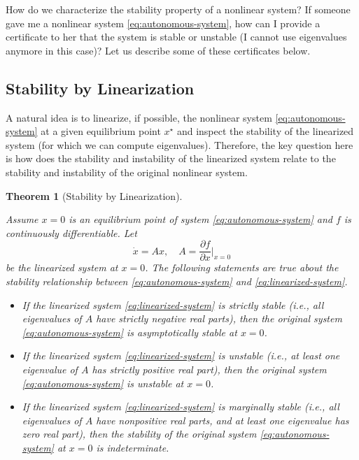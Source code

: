 \documentclass[
]{book}
\newtheorem{theorem}{Theorem}[chapter]
\theoremstyle{definition}
\theoremstyle{definition}
\theoremstyle{definition}
\theoremstyle{definition}
\theoremstyle{remark}
\begin{document}
How do we characterize the stability property of a nonlinear system? If someone gave me a nonlinear system \eqref{eq:autonomous-system}, how can I provide a certificate to her that the system is stable or unstable (I cannot use eigenvalues anymore in this case)? Let us describe some of these certificates below.

\hypertarget{stability-by-linearization}{%
\subsection{Stability by Linearization}\label{stability-by-linearization}}

A natural idea is to linearize, if possible, the nonlinear system \eqref{eq:autonomous-system} at a given equilibrium point \(x^\star\) and inspect the stability of the linearized system (for which we can compute eigenvalues). Therefore, the key question here is how does the stability and instability of the linearized system relate to the stability and instability of the original nonlinear system.

\begin{theorem}[Stability by Linearization]
\protect\hypertarget{thm:stabilitybylinearization}{}\label{thm:stabilitybylinearization}

Assume \(x=0\) is an equilibrium point of system \eqref{eq:autonomous-system} and \(f\) is continuously differentiable. Let
\begin{equation}
\dot{x} = Ax, \quad A = \frac{\partial f}{\partial x} \Big\vert_{x=0}
\label{eq:linearized-system}
\end{equation}
be the linearized system at \(x=0\). The following statements are true about the stability relationship between \eqref{eq:autonomous-system} and \eqref{eq:linearized-system}.

\begin{itemize}
\item
  If the linearized system \eqref{eq:linearized-system} is strictly stable (i.e., all eigenvalues of \(A\) have strictly negative real parts), then the original system \eqref{eq:autonomous-system} is asymptotically stable at \(x=0\).
\item
  If the linearized system \eqref{eq:linearized-system} is unstable (i.e., at least one eigenvalue of \(A\) has strictly positive real part), then the original system \eqref{eq:autonomous-system} is unstable at \(x=0\).
\item
  If the linearized system \eqref{eq:linearized-system} is marginally stable (i.e., all eigenvalues of \(A\) have nonpositive real parts, and at least one eigenvalue has zero real part), then the stability of the original system \eqref{eq:autonomous-system} at \(x=0\) is indeterminate.
\end{itemize}

\end{theorem}
\end{document}
